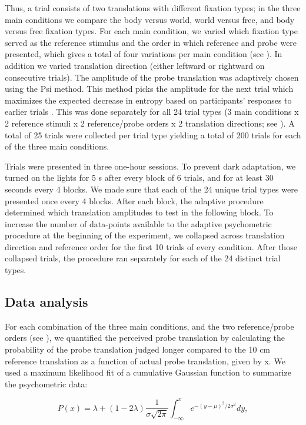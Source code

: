 Thus, a trial consists of two translations with different fixation types; in the three main conditions we compare the body versus world, world versus free, and body versus free fixation types. For each main condition, we varied which fixation type served as the reference stimulus and the order in which reference and probe were presented, which gives a total of four variations per main condition (see ). In addition we varied translation direction (either leftward or rightward on consecutive trials). The amplitude of the probe translation was adaptively chosen using the Psi method. This method picks the amplitude for the next trial which maximizes the expected decrease in entropy based on participants’ responses to earlier trials \cite{kontsevich1999}. This was done separately for all 24 trial types (3 main conditions x 2 reference stimuli x 2 reference/probe orders x 2 translation directions; see ). A total of 25 trials were collected per trial type yielding a total of 200 trials for each of the three main conditions.

Trials were presented in three one-hour sessions. To prevent dark adaptation, we turned on the lights for 5 \si{\second} after every block of 6 trials, and for at least 30 seconds every 4 blocks. We made sure that each of the 24 unique trial types were presented once every 4 blocks. After each block, the adaptive procedure determined which translation amplitudes to test in the following block. To increase the number of data-points available to the adaptive psychometric procedure at the beginning of the experiment, we collapsed across translation direction and reference order for the first 10 trials of every condition. After those collapsed trials, the procedure ran separately for each of the 24 distinct trial types.

\subsection{Data analysis}

For each combination of the three main conditions, and  the two reference/probe orders (see ), we quantified the perceived probe translation  by calculating the probability of the probe translation judged longer compared to the 10 \si{\centi\metre} reference translation as a function of actual probe translation, given by x. We used a maximum likelihood fit of a cumulative Gaussian function to summarize the psychometric data:

\begin{equation}
\label{p3:eq1}
P(x) = \lambda + (1 - 2\lambda) \frac{1}{\sigma \sqrt{2\pi}} \int_{-\infty}^{x}{e^{-(y-\mu)^2 / 2\sigma^2}}dy,
\end{equation}

